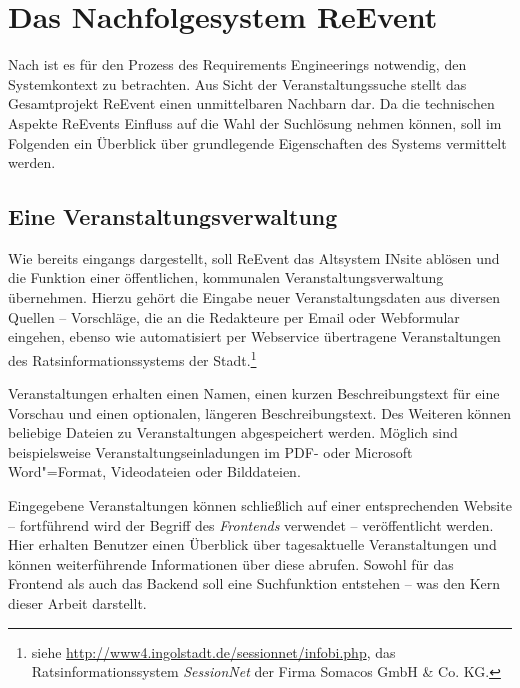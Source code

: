 

\chapter{Das Nachfolgesystem ReEvent}
\label{ch:reevent}

Nach \cite[S. 85]{Rupp.2014} ist es für den Prozess des Requirements Engineerings notwendig, den Systemkontext zu betrachten. Aus Sicht der Veranstaltungssuche stellt das Gesamtprojekt ReEvent einen unmittelbaren Nachbarn dar. Da die technischen Aspekte ReEvents Einfluss auf die Wahl der Suchlösung nehmen können, soll im Folgenden ein Überblick über grundlegende Eigenschaften des Systems vermittelt werden.

\section{Eine Veranstaltungsverwaltung}
\label{sec:reevent_about}

Wie bereits eingangs dargestellt, soll ReEvent das Altsystem INsite ablösen und die Funktion einer öffentlichen, kommunalen Veranstaltungsverwaltung übernehmen. Hierzu gehört die Eingabe neuer Veranstaltungsdaten aus diversen Quellen -- Vorschläge, die an die Redakteure per Email oder Webformular eingehen, ebenso wie automatisiert per Webservice übertragene Veranstaltungen des Ratsinformationssystems der Stadt.\footnote{ siehe \url{http://www4.ingolstadt.de/sessionnet/infobi.php}, das Ratsinformationssystem \emph{SessionNet} der Firma Somacos GmbH \& Co. KG.}

Veranstaltungen erhalten einen Namen, einen kurzen Beschreibungstext für eine Vorschau und einen optionalen, längeren Beschreibungstext. Des Weiteren können beliebige Dateien zu Veranstaltungen abgespeichert werden. Möglich sind beispielsweise Veranstaltungseinladungen im PDF- oder Microsoft Word"=Format, Videodateien oder Bilddateien.

Eingegebene Veranstaltungen können schließlich auf einer entsprechenden Website -- fortführend wird der Begriff des \emph{Frontends} verwendet -- veröffentlicht werden. Hier erhalten Benutzer einen Überblick über tagesaktuelle Veranstaltungen und können weiterführende Informationen über diese abrufen. Sowohl für das Frontend als auch das Backend soll eine Suchfunktion entstehen -- was den Kern dieser Arbeit darstellt.

